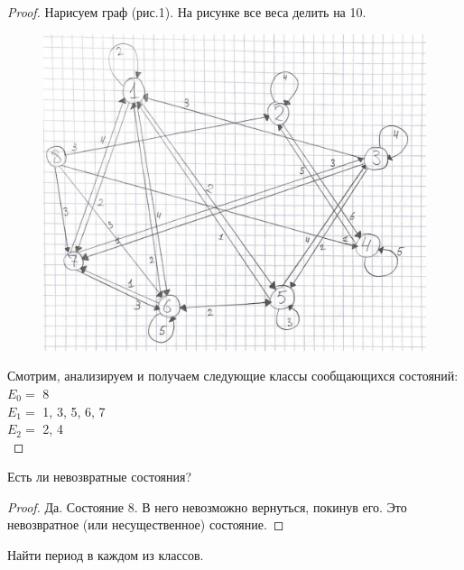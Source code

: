 \begin{proof}
Нарисуем граф (рис.1). На рисунке все веса делить на 10.\\
\begin{figure}[h!]
    \centering
    \includegraphics[width=0.5\linewidth]{1.jpeg}
    \caption{}
    \label{fig:enter-label}
\end{figure}
Смотрим, анализируем и получаем следующие классы сообщающихся состояний:\\
$E_0 = $ {8}\\
$E_1 = $ {1, 3, 5, 6, 7}\\
$E_2 = $ {2, 4}\\
\end{proof}

\begin{problem}
Есть ли невозвратные состояния?
\end{problem}

\begin{proof}
Да. Состояние 8. В него невозможно вернуться, покинув его. Это невозвратное (или несущественное) состояние.
\end{proof}

\begin{problem}
Найти период в каждом из классов.
\end{problem}

